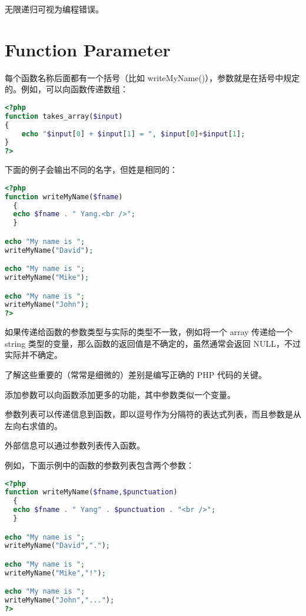 无限递归可视为编程错误。

\section{Function Parameter}



每个函数名称后面都有一个括号（比如 writeMyName()），参数就是在括号中规定的。例如，可以向函数传递数组：



\begin{lstlisting}[language=PHP]
<?php
function takes_array($input)
{
    echo "$input[0] + $input[1] = ", $input[0]+$input[1];
}
?>
\end{lstlisting}

下面的例子会输出不同的名字，但姓是相同的：


\begin{lstlisting}[language=PHP]
<?php
function writeMyName($fname)
  {
  echo $fname . " Yang.<br />";
  }

echo "My name is ";
writeMyName("David");

echo "My name is ";
writeMyName("Mike");

echo "My name is ";
writeMyName("John");
?>
\end{lstlisting}

如果传递给函数的参数类型与实际的类型不一致，例如将一个 array 传递给一个 string 类型的变量，那么函数的返回值是不确定的，虽然通常会返回 NULL，不过实际并不确定。

了解这些重要的（常常是细微的）差别是编写正确的 PHP 代码的关键。

\begin{compactitem}
\item 添加参数可以向函数添加更多的功能，其中参数类似一个变量。

\item 参数列表可以传递信息到函数，即以逗号作为分隔符的表达式列表，而且参数是从左向右求值的。

\item 外部信息可以通过参数列表传入函数。
\end{compactitem}

例如，下面示例中的函数的参数列表包含两个参数：

\begin{lstlisting}[language=PHP]
<?php
function writeMyName($fname,$punctuation)
  {
  echo $fname . " Yang" . $punctuation . "<br />";
  }

echo "My name is ";
writeMyName("David",".");

echo "My name is ";
writeMyName("Mike","!");

echo "My name is ";
writeMyName("John","...");
?>
\end{lstlisting}

